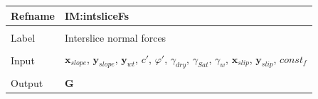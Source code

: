 \documentclass[12pt]{article}
\begin{document}
\vspace{\baselineskip}
\noindent
\begin{minipage}{\textwidth}
\begin{tabular}{>{\raggedright}p{}>{\raggedright\arraybackslash}p{}}
\toprule \textbf{Refname} & \textbf{IM:intsliceFs}
\label{IM:intsliceFs}
\\ \midrule \\
Label & Interslice normal forces
        
\\ \midrule \\
Input & ${\mathbf{x}_{slope}}$, ${\mathbf{y}_{slope}}$, ${\mathbf{y}_{wt}}$, $c'$, $φ'$, ${γ_{dry}}$, ${γ_{Sat}}$, ${γ_{w}}$, ${\mathbf{x}_{slip}}$, ${\mathbf{y}_{slip}}$, $const_f$
        
\\ \midrule \\
Output & $\mathbf{G}$
         

\end{tabular}
\end{minipage}
\end{document}
